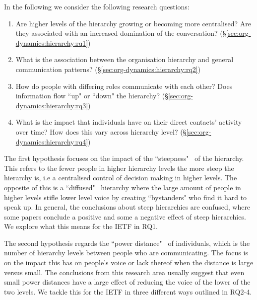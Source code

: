 \documentclass[twocolumn,10pt]{article}
\begin{document}
In the following we consider the following research questions: 
\begin{enumerate}
  \item
    Are higher levels of the hierarchy growing or becoming more
    centralised? Are they associated with an increased domination
    of the conversation?
    (\S\ref{sec:org-dynamics:hierarchy:rq1})

  \item
    What is the association between the organisation hierarchy and general
    communication patterns?
    (\S\ref{sec:org-dynamics:hierarchy:rq2})

  \item
    How do people with differing roles communicate with each other?  Does
    information flow ``up" or ``down" the hierarchy?
    (\S\ref{sec:org-dynamics:hierarchy:rq3})

  \item
    What is the impact that individuals have on their direct contacts'
    activity over time? How does this vary across hierarchy level?
    (\S\ref{sec:org-dynamics:hierarchy:rq4})

\end{enumerate}

The first hypothesis focuses on the impact of the
``steepness"~\cite{anderson2010functions} of the hierarchy. This refers to
the fewer people in higher hierarchy levels the more steep the hierarchy
is, i.e a centralised control of decision making in higher levels. The
opposite of this is a ``diffused"~\cite{hussain2019voice} hierarchy where
the large amount of people in higher levels stifle lower level voice by
creating ``bystanders" who find it hard to speak up. In general, the
conclusions about steep hierarchies are confused, where some papers
conclude a positive and some a negative effect of steep hierarchies. We
explore what this means for the IETF in RQ1.

The second hypothesis regards the ``power
distance"~\cite{li2021does,duan2018authoritarian,guo2020inclusive} of
individuals, which is the number of hierarchy levels between people who are
communicating. The focus is on the impact this has on people's voice or
lack thereof when the distance is large versus small. The conclusions from
this research area usually suggest that even small power distances have a
large effect of reducing the voice of the lower of the two levels. We
tackle this for the IETF in three different ways outlined in RQ2-4.
\end{document}
